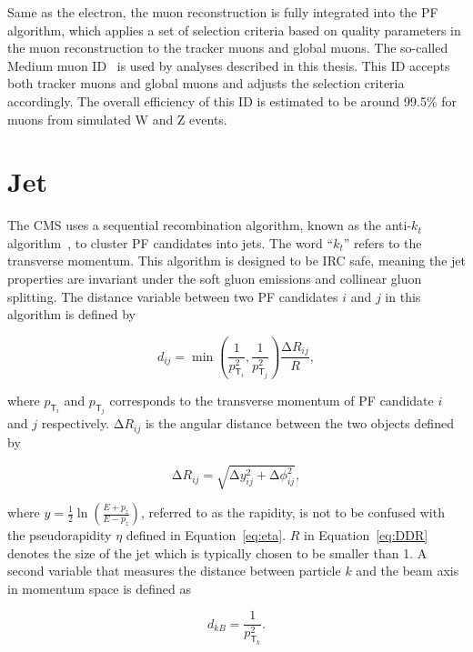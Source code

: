 Same as the electron, the muon reconstruction is fully integrated into the \ac{PF} algorithm, which applies a set of selection criteria based on quality parameters in the muon reconstruction to the tracker muons and global muons. The so-called Medium muon ID~\cite{CMS:2018rym} is used by analyses described in this thesis. This ID accepts both tracker muons and global muons and adjusts the selection criteria accordingly. The overall efficiency of this ID is estimated to be around 99.5\% for muons from simulated W and Z events.

\section{Jet}
\label{sec:Jet}

The \ac{CMS} uses a sequential recombination algorithm, known as the anti-$k_t$ algorithm~\cite{Cacciari:2008gp}, to cluster \ac{PF} candidates into jets. The word ``$k_t$'' refers to the transverse momentum. This algorithm is designed to be \ac{IRC} safe, meaning the jet properties are invariant under the soft gluon emissions and collinear gluon splitting. The distance variable between two \ac{PF} candidates $i$ and $j$ in this algorithm is defined by 

\begin{equation}
\label{eq:ak}
d_{ij} = \min(\frac{1}{p_{\textsf{T}_i}^2},\frac{1}{p_{\textsf{T}_j}^2})\frac{\mathrm{\Delta}R_{ij}}{R},
\end{equation}

where $p_{\textsf{T}_i}$ and $p_{\textsf{T}_j}$ corresponds to the transverse momentum of \ac{PF} candidate $i$ and $j$ respectively. $\mathrm{\Delta}R_{ij}$ is the angular distance between the two objects defined by

\begin{equation}
\mathrm{\Delta}R_{ij} = \sqrt{\mathrm{\Delta}y_{ij}^2+\mathrm{\Delta}\phi_{ij}^2},
\label{eq:DDR}
\end{equation}

where $y=\frac{1}{2}\ln(\frac{E+p_z}{E-p_z})$, referred to as the rapidity, is not to be confused with the pseudorapidity $\eta$ defined in Equation~\ref{eq:eta}. $R$ in Equation~\ref{eq:DDR} denotes the size of the jet which is typically chosen to be smaller than 1. A second variable that measures the distance between particle $k$ and the beam axis in momentum space is defined as 

\begin{equation}
d_{kB} = \frac{1}{p_{\textsf{T}_k}^2}.
\end{equation}


